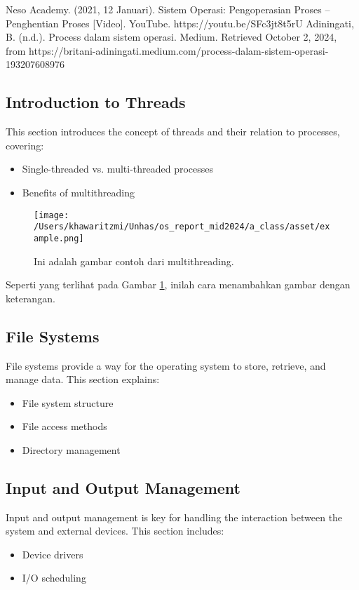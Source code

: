 \documentclass[12pt]{article}
\begin{document}
\begin{thebibliography}{99}
    Neso Academy. (2021, 12 Januari). Sistem Operasi: Pengoperasian Proses – Penghentian Proses [Video]. YouTube. https://youtu.be/SFc3jt8t5rU
    Adiningati, B. (n.d.). Process dalam sistem operasi. Medium. Retrieved October 2, 2024, from https://britani-adiningati.medium.com/process-dalam-sistem-operasi-193207608976
\end{thebibliography}

\subsection{Introduction to Threads}
This section introduces the concept of threads and their relation to processes, covering:
\begin{itemize}
    \item Single-threaded vs. multi-threaded processes
    \item Benefits of multithreading 
\end{itemize}

\begin{figure}[h]
    \centering
    \texttt{[image: /Users/khawaritzmi/Unhas/os\_report\_mid2024/a\_class/asset/example.png]}  %
    \caption{Ini adalah gambar contoh dari multithreading.}
    \label{fig:contoh_gambar}
\end{figure}

Seperti yang terlihat pada Gambar \ref{fig:contoh_gambar}, inilah cara menambahkan gambar dengan keterangan.

\subsection{File Systems}
File systems provide a way for the operating system to store, retrieve, and manage data. This section explains:
\begin{itemize}
    \item File system structure
    \item File access methods
    \item Directory management
\end{itemize}

\subsection{Input and Output Management}
Input and output management is key for handling the interaction between the system and external devices. This section includes:
\begin{itemize}
    \item Device drivers
    \item I/O scheduling
\end{itemize}
\end{document}
